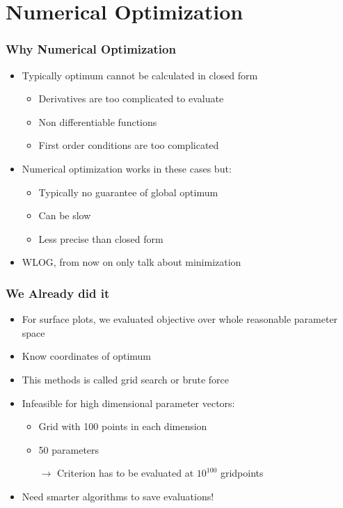 \documentclass[11pt]{beamer}
\begin{document}
\section{Numerical Optimization}


\begin{frame}[c]\frametitle{Why Numerical Optimization}
    \begin{itemize}
        \item Typically optimum cannot be calculated in closed form
        \begin{itemize}
            \item Derivatives are too complicated to evaluate
            \item Non differentiable functions
            \item First order conditions are too complicated
        \end{itemize}
        \item Numerical optimization works in these cases but:
        \begin{itemize}
            \item Typically no guarantee of global optimum
            \item Can be slow
            \item Less precise than closed form
        \end{itemize}
        \item WLOG, from now on only talk about minimization
    \end{itemize}
\end{frame}



\begin{frame}[c]\frametitle{We Already did it}
    \begin{itemize}
        \item For surface plots, we evaluated objective over whole reasonable parameter space
        \item Know coordinates of optimum
        \item This methods is called grid search or brute force
        \item Infeasible for high dimensional parameter vectors:
        \begin{itemize}
            \item Grid with 100 points in each dimension
            \item 50 parameters
            \item[$\rightarrow$] Criterion has to be evaluated at $10^{100}$ gridpoints
        \end{itemize}
        \item Need smarter algorithms to save evaluations!
    \end{itemize}
\end{frame}
\end{document}
